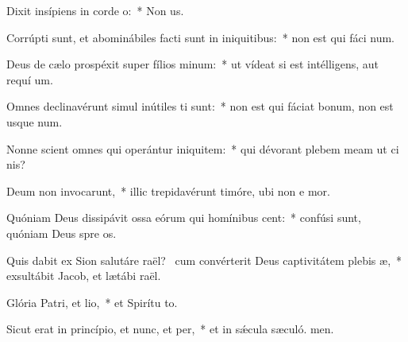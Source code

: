 \item Dixit insípiens in corde o:~* Non  us.
\item Corrúpti sunt, et abominábiles facti sunt in iniquitibus:~* non est qui fáci num.
\item Deus de cælo prospéxit super fílios minum:~* ut vídeat si est intélligens, aut requí um.
\item Omnes declinavérunt simul inútiles ti sunt:~* non est qui fáciat bonum, non est usque  num.
\item Nonne scient omnes qui operántur iniquitem:~* qui dévorant plebem meam ut ci nis?
\item Deum non invocarunt,~* illic trepidavérunt timóre, ubi non e mor.
\item Quóniam Deus dissipávit ossa eórum qui homínibus cent:~* confúsi sunt, quóniam Deus spre os.
\item Quis dabit ex Sion salutáre raël?~\pscross{} cum convérterit Deus captivitátem plebis æ,~* exsultábit Jacob, et lætábi raël.
\item Glória Patri, et lio,~* et Spirítu to.
\item Sicut erat in princípio, et nunc, et per,~* et in sǽcula sæculó. men.
